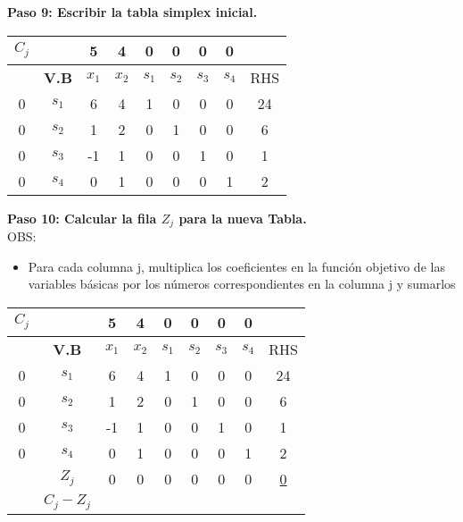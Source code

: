 \documentclass{templateNote}
\begin{document}
\newpage
\noindent
\textbf{Paso 9: Escribir la tabla simplex inicial.}
\begin{center}
    \begin{tabular}{|c|c|c|c|c|c|c|c|c|}
        \hline
        $C_j$ & & 5 & 4 & 0 & 0 & 0 & 0 & \\ \hline
        & \textbf{V.B} & $x_1$ & $x_2$ & $s_1$ & $s_2$ & $s_3$ & $s_4$ & RHS \\ \hline
        0 & $s_1$ & 6 & 4 & 1 & 0 & 0 & 0 & 24 \\ \hline
        0 & $s_2$ & 1 & 2 & 0 & 1 & 0 & 0 & 6 \\ \hline
        0 & $s_3$ & -1 & 1 & 0 & 0 & 1 & 0 & 1 \\ \hline
        0 & $s_4$ & 0 & 1 & 0 & 0 & 0 & 1 & 2 \\ \hline
    \end{tabular}
\end{center}
\textbf{Paso 10: Calcular la fila $Z_j$ para la nueva Tabla.}
\\
OBS:
\begin{itemize}
    \item Para cada columna j, multiplica los coeficientes en la función objetivo de las variables básicas por los números correspondientes en la columna j y sumarlos
\end{itemize}
\begin{center}
    \begin{tabular}{|c|c|c|c|c|c|c|c|c|}
        \hline
        $C_j$ & & 5 & 4 & 0 & 0 & 0 & 0 & \\ \hline
        & \textbf{V.B} & $x_1$ & $x_2$ & $s_1$ & $s_2$ & $s_3$ & $s_4$ & RHS \\ \hline
        \cellcolor{green!50}0 & $s_1$ & \cellcolor{green!50}6 & 4 & 1 & 0 & 0 & 0 & 24 \\ \hline
        \cellcolor{blue!50}0 & $s_2$ & \cellcolor{blue!50}1 & 2 & 0 & 1 & 0 & 0 & 6 \\ \hline
        \cellcolor{orange!50}0 & $s_3$ & \cellcolor{orange!50}-1 & 1 & 0 & 0 & 1 & 0 & 1 \\ \hline
        \cellcolor{yellow!50}0 & $s_4$ & \cellcolor{yellow!50}0 & 1 & 0 & 0 & 0 & 1 & 2 \\ \hline
        & $Z_j$ & \cellcolor{red!50}0 & 0 & 0 & 0 & 0 & 0 & \underline{0} \\ \hline
        & $C_j - Z_j$ & & & & & & & \\ \hline
    \end{tabular}
\end{center}
\end{document}
